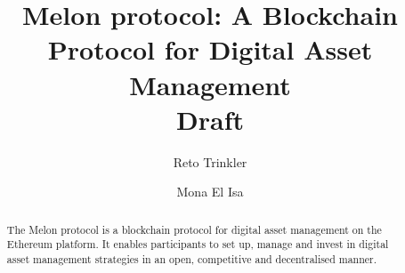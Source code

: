 \documentclass[9pt,oneside]{amsart}
\title{Melon protocol: A Blockchain Protocol for Digital Asset Management \\ {\smaller \textbf{Draft}}}
\author{Reto Trinkler}
\author{Mona El Isa}
\theoremstyle{plain}
\begin{document}
        
    \pagecolor{lightgreen}
        
    \begin{abstract}
        
    The Melon protocol is a blockchain protocol for digital asset management on the Ethereum platform. It enables participants to set up, manage and invest in digital asset management strategies in an open, competitive and decentralised manner.
    
    \end{abstract}
    
    \maketitle
    
    \setlength{\columnsep}{20pt}
    
\end{document}
